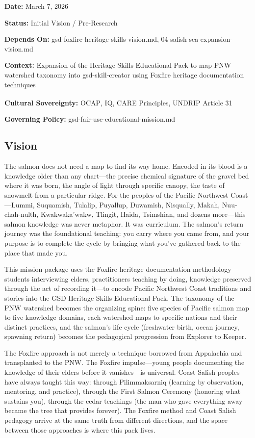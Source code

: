 \documentclass[11pt,letterpaper]{article}
\newcommand{\metafield}[2]{\textbf{\sffamily #1} #2\par}
\begin{document}
\metafield{Date:}{March 7, 2026}
\metafield{Status:}{Initial Vision / Pre-Research}
\metafield{Depends On:}{gsd-foxfire-heritage-skills-vision.md, 04-salish-sea-expansion-vision.md}
\metafield{Context:}{Expansion of the Heritage Skills Educational Pack to map PNW watershed taxonomy into gsd-skill-creator using Foxfire heritage documentation techniques}
\metafield{Cultural Sovereignty:}{OCAP\textsuperscript{\textregistered}, IQ, CARE Principles, UNDRIP Article 31}
\metafield{Governing Policy:}{gsd-fair-use-educational-mission.md}

\subsection{Vision}

The salmon does not need a map to find its way home. Encoded in its blood is a knowledge older than any chart---the precise chemical signature of the gravel bed where it was born, the angle of light through specific canopy, the taste of snowmelt from a particular ridge. For the peoples of the Pacific Northwest Coast---Lummi, Suquamish, Tulalip, Puyallup, Duwamish, Nisqually, Makah, Nuu-chah-nulth, Kwakwaka'wakw, Tlingit, Haida, Tsimshian, and dozens more---this salmon knowledge was never metaphor. It was curriculum. The salmon's return journey was the foundational teaching: you carry where you came from, and your purpose is to complete the cycle by bringing what you've gathered back to the place that made you.

This mission package uses the Foxfire heritage documentation methodology---students interviewing elders, practitioners teaching by doing, knowledge preserved through the act of recording it---to encode Pacific Northwest Coast traditions and stories into the GSD Heritage Skills Educational Pack. The taxonomy of the PNW watershed becomes the organizing spine: five species of Pacific salmon map to five knowledge domains, each watershed maps to specific nations and their distinct practices, and the salmon's life cycle (freshwater birth, ocean journey, spawning return) becomes the pedagogical progression from Explorer to Keeper.

The Foxfire approach is not merely a technique borrowed from Appalachia and transplanted to the PNW. The Foxfire impulse---young people documenting the knowledge of their elders before it vanishes---is universal. Coast Salish peoples have always taught this way: through Pilimmaksarniq (learning by observation, mentoring, and practice), through the First Salmon Ceremony (honoring what sustains you), through the cedar teachings (the man who gave everything away became the tree that provides forever). The Foxfire method and Coast Salish pedagogy arrive at the same truth from different directions, and the space between those approaches is where this pack lives.
\end{document}
